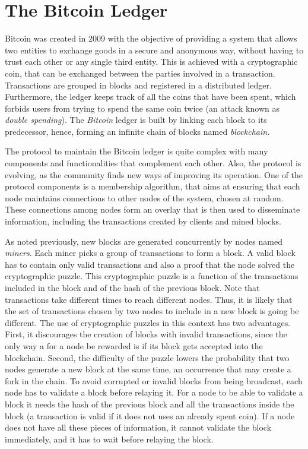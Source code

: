 \documentclass{dads}   %
\begin{document}
\section{The {\secit Bitcoin} Ledger}

Bitcoin was created in 2009 with the objective of providing a system that allows two entities to exchange goods in a secure and anonymous way, without having to trust each other or any single third entity. This is achieved with a cryptographic coin, that can be exchanged between the parties involved in a transaction. Transactions are grouped in blocks and registered in a distributed ledger. Furthermore, the ledger keeps track of all the coins that have been spent, which forbids users from trying to spend the same coin twice (an attack known as \textit{double spending}). The \textit{Bitcoin} ledger is built by linking each block to its predecessor, hence, forming an infinite chain of blocks named \textit{blockchain}.

The protocol to maintain the Bitcoin ledger is quite complex with many components and functionalities that complement each other. Also, the protocol is evolving, as the community finds new ways of improving its operation. One of the protocol components is a membership algorithm,  that aims at ensuring that each node maintains connections to other nodes of the system, chosen at random. These connections among nodes form an overlay that is then used to disseminate information, including the transactions created by clients and mined blocks.

As noted previously, new blocks are generated concurrently by nodes named \textsl{miners}. Each miner picks a group of transactions to form a block. A valid block has to contain only valid transactions and also a proof that the node solved the cryptographic puzzle. This cryptographic puzzle is a function of the transactions included in the block and of the hash of the previous block. Note that transactions take different times to reach different nodes. Thus, it is likely that the set of transactions chosen by two nodes to include in a new block is going be different. 
The use of cryptographic puzzles in this context has two advantages. First, it discourages the creation of blocks with invalid transactions, since the only way a for a node be rewarded is if its block gets accepted into the blockchain. Second, the difficulty of the puzzle lowers the probability that two nodes generate a new block at the same time, an occurrence that may create a fork in the chain.  To avoid corrupted or invalid blocks from being broadcast, each node has to validate a block before relaying it. For a node to be able to validate a block it needs the hash of the previous block and all the transactions inside the block (a transaction is valid if it does not uses an already spent coin).  If a node does not have all these pieces of information, it cannot validate the block immediately, and it has to wait before relaying the block.
\end{document}

